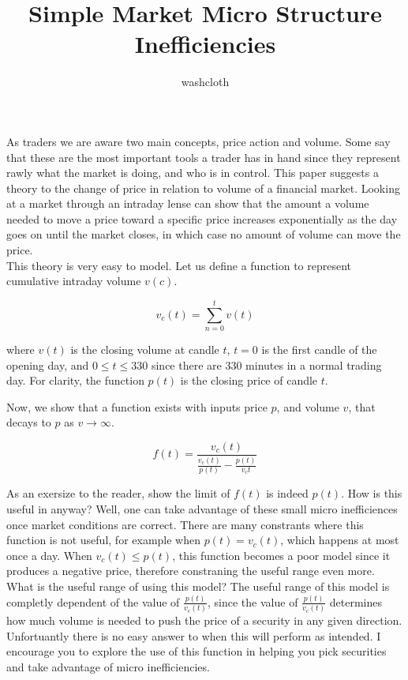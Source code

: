 \documentclass{article}
\title{Simple Market Micro Structure Inefficiencies}
\author{washcloth}
\begin{document}
  \maketitle

  As traders we are aware two main concepts, price action and volume. Some
  say that these are the most important tools a trader has in hand since they
  represent rawly what the market is doing, and who is in control. This paper
  suggests a theory to the change of price in relation to volume of a financial
  market. Looking at a market through an intraday lense can show that
  the amount a volume needed to move a price toward a specific price increases
  exponentially as the day goes on until the market closes, in which case no
  amount of volume can move the price.
  \\

  This theory is very easy to model. Let  us define a function to represent
  cumulative intraday volume $v(c)$.

  \[
    v_c(t) = \sum_{n=0}^{t} v(t)
  \]

  where $v(t)$ is the closing volume at candle $t$, $t = 0$ is the first candle
  of the opening day, and $0 \le t \le 330$ since there are $330$ minutes in a
  normal trading day. For clarity, the function $p(t)$ is the closing price
  of candle $t$.

  Now, we show that a function exists with inputs price $p$, and volume $v$,
  that decays to $p$ as $v \rightarrow \infty$.

  \[
    f(t) = \frac{v_c(t)}{\frac{v_c(t)}{p(t)} - \frac{p(t)}{v_c{t}}}
  \]

  As an exersize to the reader, show the limit of $f(t)$ is indeed $p(t)$.
  How is this useful in anyway? Well, one can take advantage of these small
  micro inefficiences once market conditions are correct.
  There are many constrants where this function is not useful,
  for example when $p(t) = v_c(t)$, which happens at most once a day.
  When $v_c(t) \le p(t)$, this function becomes a poor model since it produces
  a negative price, therefore constraning the useful range even more. What
  is the useful range of using this model? The useful range of this model
  is completly dependent of the value of $\frac{p(t)}{v_c(t)}$, since
  the value of $\frac{p(t)}{v_c(t)}$ determines how much volume is needed
  to push the price of a security in any given direction. Unfortuantly
  there is no easy answer to when this will perform as intended. I encourage
  you to explore the use of this function in helping you pick securities
  and take advantage of micro inefficiencies.
\end{document}
